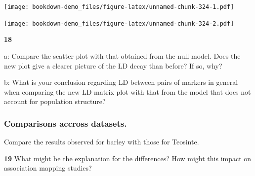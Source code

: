\documentclass[
]{book}
\makeatletter
\newenvironment{Shaded}{\begin{snugshade}}{\end{snugshade}}
\newcommand{\AttributeTok}[1]{\textcolor[rgb]{0.77,0.63,0.00}{#1}}
\newcommand{\DecValTok}[1]{\textcolor[rgb]{0.00,0.00,0.81}{#1}}
\newcommand{\FloatTok}[1]{\textcolor[rgb]{0.00,0.00,0.81}{#1}}
\newcommand{\FunctionTok}[1]{\textcolor[rgb]{0.00,0.00,0.00}{#1}}
\newcommand{\NormalTok}[1]{#1}
\newcommand{\OtherTok}[1]{\textcolor[rgb]{0.56,0.35,0.01}{#1}}
\newcommand{\SpecialCharTok}[1]{\textcolor[rgb]{0.00,0.00,0.00}{#1}}
\newcommand{\StringTok}[1]{\textcolor[rgb]{0.31,0.60,0.02}{#1}}
\newenvironment{kframe}{%
\medskip{}
\setlength{\fboxsep}{.8em}
 \def\at@end@of@kframe{}%
 \ifinner\ifhmode%
  \def\at@end@of@kframe{\end{minipage}}%
  \begin{minipage}{\columnwidth}%
 \fi\fi%
 \def\FrameCommand##1{\hskip\@totalleftmargin \hskip-\fboxsep
 \colorbox{shadecolor}{##1}\hskip-\fboxsep
     \hskip-\linewidth \hskip-\@totalleftmargin \hskip\columnwidth}%
 \MakeFramed {\advance\hsize-\width
   \@totalleftmargin\z@ \linewidth\hsize
   \@setminipage}}%
 {\par\unskip\endMakeFramed%
 \at@end@of@kframe}
\newenvironment{rmdblock}[1]
  {
  \begin{itemize}
  \renewcommand{\labelitemi}{
    \raisebox{-.7\height}[0pt][0pt]{
      {\setkeys{Gin}{width=3em,keepaspectratio}\texttt{[image: images/\#1]}}
    }
  }
  \setlength{\fboxsep}{1em}
  \begin{kframe}
  \item
  }
  {
  \end{kframe}
  \end{itemize}
  }
\newenvironment{rmdquiz}
  {\begin{rmdblock}{quiz}}
  {\end{rmdblock}}
\makeatother
\begin{document}
\texttt{[image: bookdown-demo\_files/figure-latex/unnamed-chunk-324-1.pdf]}

\begin{Shaded}
\end{Shaded}

\texttt{[image: bookdown-demo\_files/figure-latex/unnamed-chunk-324-2.pdf]}

\begin{rmdquiz}
\textbf{18}

a: Compare the scatter plot with that obtained from the null model. Does the new plot give a clearer picture of the LD decay than before? If so, why?

b: What is your conclusion regarding LD between pairs of markers in general when comparing the new LD matrix plot with that from the model that does not account for population structure?
\end{rmdquiz}

\hypertarget{comparisons-accross-datasets.}{%
\subsubsection{Comparisons accross datasets.}\label{comparisons-accross-datasets.}}

Compare the results observed for barley with those for Teosinte.

\begin{rmdquiz}
\textbf{19}
What might be the explanation for the differences? How might this impact on association mapping studies?
\end{rmdquiz}
\end{document}
